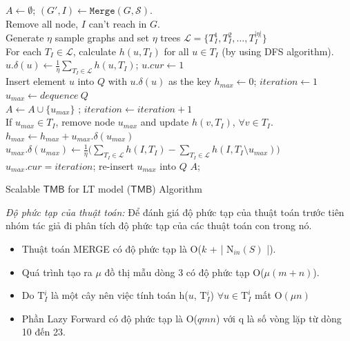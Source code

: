 \begin{algorithm}[H]
$A \leftarrow \emptyset$;	$(G', I) \leftarrow \mathtt{Merge}(G, \mathcal{S})$.
\\
Remove all node, $I$ can't reach in $G$.
\\
Generate $\eta$ sample graphs and set $\eta$ trees $\mathcal{L}=\{T_{I}^1, T_{I}^2, \ldots, T_{I}^{|\mathcal{\eta}|}\}$
\\
For each $ T_{I} \in \mathcal{L}$, calculate $h(u, T_{I})$ for all $u \in T_{I}$ (by using DFS algorithm).
\\
{
	$u.\delta(u) \leftarrow \frac{1}{\eta}\sum_{T_{I} \in \mathcal{L}} h(u, T_{I})$; $u. cur \leftarrow 1$
	\\
	Insert element $u$ into $Q$ with $u.\delta(u)$ as the key
}
$ h_{max} \leftarrow 0$; $iteration \leftarrow 1$
\\
{
	$u_{max} \leftarrow  dequence \  Q$
	\\
	{
		$A \leftarrow A \cup \{u_{max}\}$ ; $iteration \leftarrow iteration+1 $
		\\
		{
			If $u_{max} \in T_{I}$, remove node $u_{max}$ and update $h(v, T_{I})$, $ \forall v \in T_{I}$.
		}
		$h_{max} \leftarrow h_{max}+ u_{max}.\delta(u_{max})$
	}
	{
		$u_{max}. \delta(u_{max}) \leftarrow  \frac{1}{\eta}\big(\sum_{T_{I} \in \mathcal{L}}h(I, T_{I}) - \sum_{T_{I} \in \mathcal{L}} h(I, T_{I} \setminus u_{max})\big)$
		\\
		$u_{max}. cur =iteration$; re-insert $u_{max}$ into $Q$
	}
}
\Return $A$;
\caption{Scalable $\mathsf{TMB}$ for LT model ($\mathsf{TMB}$) Algorithm}
\label{STMB}
\end{algorithm}				
{\itshape Độ phức tạp của thuật toán: }		
Để đánh giá độ phức tạp của thuật toán trước tiên nhóm tác giả đi phân tích độ phức tạp của các thuật toán con trong nó.
\begin {itemize}
\item Thuật toán MERGE có độ phức tạp là O($k$ + | N$_{in}(S)$ |).

\item Quá trình tạo ra $\mu$ đồ thị mẫu dòng 3 có độ phức tạp O($\mu(m + n)$).

\item Do T$_{I}^i$ là một cây nên việc tính toán h($u$, T$_{I}^i$) $\forall u \in \text{T}_{I}^i$ mất O$(\mu n)$ 

\item Phần Lazy Forward có độ phức tạp là O($qmn$) với q là số vòng lặp từ dòng 10 đến 23.
\end {itemize}


